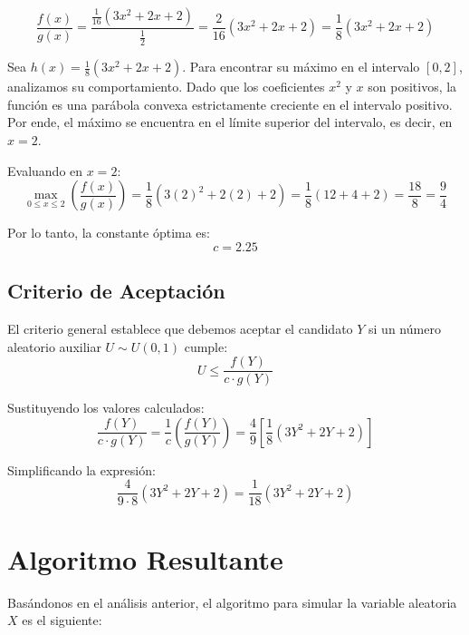 \documentclass[12pt, a4paper]{article}
\begin{document}
	\begin{equation}
		\frac{f(x)}{g(x)} = \frac{\frac{1}{16}(3x^2 + 2x + 2)}{\frac{1}{2}} = \frac{2}{16}(3x^2 + 2x + 2) = \frac{1}{8}(3x^2 + 2x + 2)
	\end{equation}
	
	Sea $h(x) = \frac{1}{8}(3x^2 + 2x + 2)$. Para encontrar su máximo en el intervalo $[0, 2]$, analizamos su comportamiento. Dado que los coeficientes $x^2$ y $x$ son positivos, la función es una parábola convexa estrictamente creciente en el intervalo positivo. Por ende, el máximo se encuentra en el límite superior del intervalo, es decir, en $x = 2$.
	
	Evaluando en $x = 2$:
	\begin{equation}
		\max_{0 \leq x \leq 2} \left( \frac{f(x)}{g(x)} \right) = \frac{1}{8}(3(2)^2 + 2(2) + 2) = \frac{1}{8}(12 + 4 + 2) = \frac{18}{8} = \frac{9}{4}
	\end{equation}
	
	Por lo tanto, la constante óptima es:
	\begin{equation}
		c = 2.25
	\end{equation}
	
	\subsection{Criterio de Aceptación}
	
	El criterio general establece que debemos aceptar el candidato $Y$ si un número aleatorio auxiliar $U \sim U(0,1)$ cumple:
	\[ U \leq \frac{f(Y)}{c \cdot g(Y)} \]
	
	Sustituyendo los valores calculados:
	\begin{equation}
		\frac{f(Y)}{c \cdot g(Y)} = \frac{1}{c} \left( \frac{f(Y)}{g(Y)} \right) = \frac{4}{9} \left[ \frac{1}{8}(3Y^2 + 2Y + 2) \right]
	\end{equation}
	
	Simplificando la expresión:
	\begin{equation}
		\frac{4}{9 \cdot 8} (3Y^2 + 2Y + 2) = \frac{1}{18} (3Y^2 + 2Y + 2)
	\end{equation}
	
	\section{Algoritmo Resultante}
	
	Basándonos en el análisis anterior, el algoritmo para simular la variable aleatoria $X$ es el siguiente:
	
\end{document}
